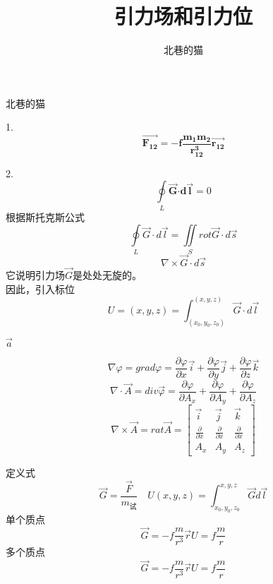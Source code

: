 \documentclass[UTF8]{ctexart}       %
\author{北巷的猫}
\title{引力场和引力位}
\begin{document}
\maketitle      %

{\heiti 北巷的猫}

1.{} \\
$$ \overrightarrow{\mathbf{F_{12}}} = \mathbf{-f\frac{m_1m_2}{r_{12} ^3}}\overrightarrow{\mathbf{r_{12}}}$$

2.{}
$$ \oint\limits_L\overrightarrow{\mathbf{G}}\mathbf{\cdot d\overrightarrow {l}} = 0$$
根据斯托克斯公式
$$\oint\limits_L \overrightarrow{G}\cdot d\overrightarrow{l} = \iint\limits_S rot\overrightarrow{G}\cdot d\overrightarrow{s}$$
$$\nabla \times \overrightarrow{G}\cdot d\overrightarrow{s}$$
它说明引力场$\overrightarrow{G}$是处处无旋的。\\
因此，引入标位
$$ U=(x,y,z)=\int _{(x_0,y_0,z_0)}^{(x,y,z)}\overrightarrow{G}\cdot d\overrightarrow{l} $$

$\vec{a}$

$$\nabla\varphi = grad\varphi = \frac{\partial\varphi}{\partial x}\vec {i}+ \frac{\partial\varphi}{\partial y}\vec {j} + \frac{\partial\varphi}{\partial z}\vec {k}$$
$$\nabla \cdot \vec{A} = div\vec{\varphi}=
\frac{\partial\varphi}{\partial A_x} + \frac{\partial\varphi}{\partial A_ y} + \frac{\partial\varphi}{\partial A_z}$$
\[\nabla \times \vec{A} = rat \vec{A} =\begin{bmatrix}
                                           \vec{i} & \vec{j} & \vec{k} \\
                                           \frac{\partial}{\partial x} & \frac{\partial}{\partial x} & \frac{\partial}{\partial x} \\
                                           A_ x & A_ y & A_ z
                                         \end{bmatrix} \]
                                         
                                         
定义式$$ \vec{G}=\frac{\vec{F}}{m_{试}}\quad U(x,y,z)=\int^{x,y,z}_{x_0,y_0,z_0}\vec{G}d\vec{l}$$
单个质点$$\vec{G}=-f\frac{m}{r^3}\vec{r}U=f\frac{m}{r}$$
多个质点$$\vec{G}=-f\frac{m}{r^3}\vec{r}U=f\frac{m}{r}$$
\end{document}
